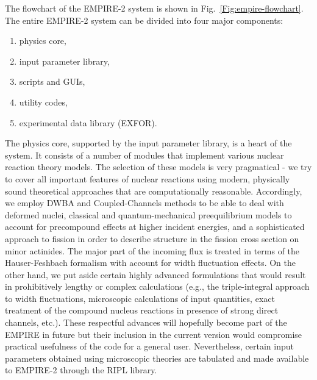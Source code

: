 \documentclass[twocolumn,amsmath,amssymb,10pt,groupedaddress,a4paper]{revtex4}
\begin{document}
The flowchart of the EMPIRE-2 system is shown in Fig.~\ref{Fig:empire-flowchart}.
The entire EMPIRE-2 system can be divided into four major components:
\begin{enumerate}
\item physics core,
\item input parameter library,
\item scripts and GUIs,
\item utility codes,
\item experimental data library (EXFOR).
\end{enumerate}
The physics core, supported by the input parameter library, is a heart of the system. It consists of a number of modules that implement various nuclear reaction theory models. The selection of these models is very pragmatical - we try to cover all important features of nuclear reactions using modern, physically sound theoretical approaches  that are computationally reasonable.  Accordingly,
we employ DWBA and Coupled-Channels methods to be able to deal with deformed nuclei, classical and quantum-mechanical preequilibrium models to account for precompound effects at higher incident energies, and a sophisticated approach to fission in order to describe structure in the fission cross section on minor actinides. The major part of the incoming flux is treated in terms of the Hauser-Feshbach formalism with account for width fluctuation effects. On the other hand, we put aside certain highly advanced formulations that would result in prohibitively lengthy or complex calculations (e.g., the triple-integral approach to width fluctuations, microscopic calculations of input quantities, exact treatment of the compound nucleus reactions in presence of strong direct channels, etc.). These respectful advances will hopefully become part of the EMPIRE in future but their inclusion in the current version would compromise practical usefulness of the code for a general user. Nevertheless, certain input parameters obtained using microscopic theories  are tabulated and made available to EMPIRE-2 through the RIPL library.
\end{document}
